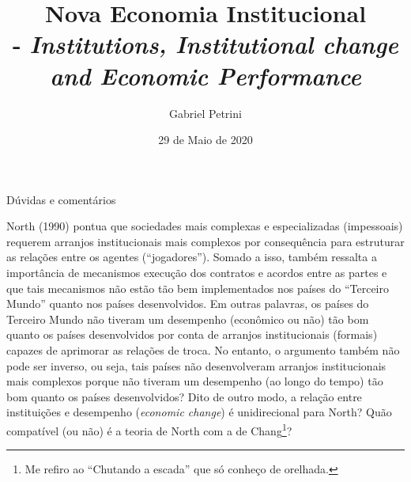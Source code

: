 \documentclass[11pt,lineno]{../style}
\title{
\large{Nova Economia Institucional}\vspace{2pt}\\
\Huge{\autor - \textit{Institutions, Institutional change and Economic Performance}}
}
\date{29 de Maio de 2020}
\author[$\ast$]{Gabriel Petrini}
\affil[$\ast$]{PhD Student at Unicamp.}
\newcommand{\autor}{North (1990) }
\begin{document}
\maketitle
\marginmark
\thispagestyle{firststyle}






	
\begin{redbox}{Dúvidas e comentários}
	
	\autor 	pontua que sociedades mais complexas e especializadas (impessoais) requerem arranjos institucionais mais complexos por consequência para estruturar as relações entre os agentes (``jogadores''). Somado a isso, também ressalta a importância de mecanismos execução dos contratos e acordos entre as partes e que tais mecanismos não estão tão bem implementados nos países do ``Terceiro Mundo'' quanto nos países desenvolvidos. Em outras palavras, os países do Terceiro Mundo não tiveram um desempenho (econômico ou não) tão bom quanto os países desenvolvidos por conta de arranjos institucionais (formais) capazes de aprimorar as relações de troca. No entanto, o argumento também não pode ser inverso, ou seja, tais países não desenvolveram arranjos institucionais mais complexos porque não tiveram um desempenho (ao longo do tempo) tão bom quanto os países desenvolvidos? Dito de outro modo, a relação entre instituições e desempenho (\textit{economic change}) é unidirecional para North? Quão compatível (ou não) é a teoria de North com a de Chang\footnote{Me refiro ao ``Chutando a escada'' que só conheço de orelhada.}?
	
\end{redbox}
\end{document}
